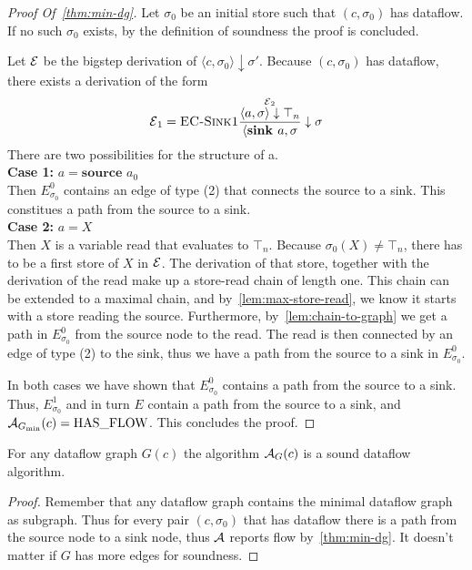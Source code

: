 \begin{proof}[Proof Of~\autoref{thm:min-dg}]
    Let $\sigma_0$ be an initial store such that $(c, \sigma_0)$ has dataflow.
    If no such $\sigma_0$ exists, by the definition of soundness
    the proof is concluded.

    Let $\operatorname{\mathcal{E}}$ be the bigstep derivation of
    $\langle c, \sigma_0 \rangle \downarrow \sigma'$.
    Because $(c, \sigma_0)$ has dataflow, there exists a derivation of the form 
    \begin{equation*}
        \operatorname{\mathcal{E}}_1 = \textsc{EC-Sink1}\frac{\displaystyle \overset{\operatorname{\mathcal{E}}_2}{\langle a, \sigma \rangle \downarrow \top_n}}{\displaystyle \langle \textbf{sink } a, \sigma} \downarrow \sigma
    \end{equation*}
    There are two possibilities for the structure of a.\\
    \textbf{Case 1:} $a = \textbf{source }a_0$\\
    Then $E^0_{\sigma_0}$ contains an edge of type (2) that connects the source 
    to a sink. This constitues a path from the source to a sink.\\
    \textbf{Case 2:} $a = X$\\
    Then $X$ is a variable read that evaluates to $\top_n$.
    Because $\sigma_0(X) \neq \top_n$, there has to be a first store
    of $X$ in $\operatorname{\mathcal{E}}$.
    The derivation of that store, together with the derivation of the read make 
    up a store-read chain of length one.
    This chain can be extended to a maximal chain, and 
    by~\autoref{lem:max-store-read}, we know it starts with a store reading the
    source.
    Furthermore, by~\autoref{lem:chain-to-graph} we get a path in $E^0_{\sigma_0}$
    from the source node to the read. The read is then connected by an edge
    of type (2) to the sink, thus we have a path from the source to a sink in 
    $E^0_{\sigma_0}$.

    In both cases we have shown that $E^0_{\sigma_0}$ contains a path from the 
    source to a sink. Thus, $E^1_{\sigma_0}$ and in turn $E$ contain a path
    from the source to a sink, and $\operatorname{\mathcal{A}}_{G_\text{min}}(c) = \text{HAS\_FLOW}$.
    This concludes the proof.
\end{proof}

\begin{corollary}
    \label{cor:dg-sound}
    For any dataflow graph $G(c)$ the algorithm $\operatorname{\mathcal{A}}_{G}(c)$ is a sound
     dataflow algorithm.
\end{corollary}
\begin{proof}
    Remember that any dataflow graph contains the minimal dataflow graph as 
    subgraph. Thus for every pair $(c, \sigma_0)$ that has dataflow
    there is a path from the source node to a sink node, 
    thus $\operatorname{\mathcal{A}}$ reports flow by~\autoref{thm:min-dg}.
    It doesn't matter if $G$ has more edges for soundness.
\end{proof}

